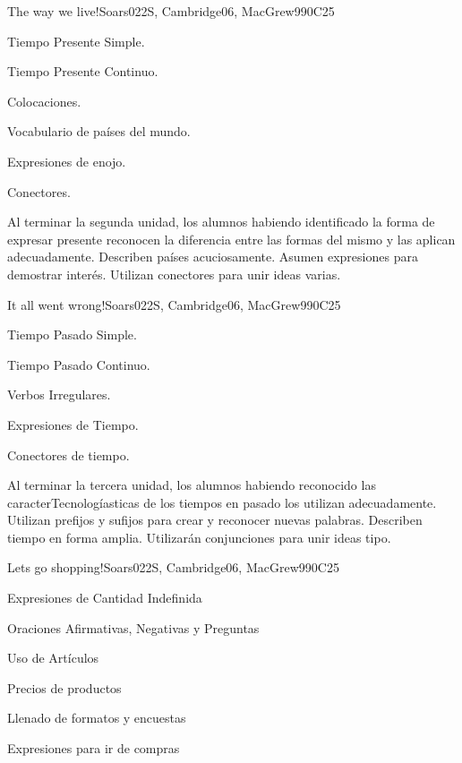 \begin{syllabus}
\begin{unit}{The way we live!}{}{Soars022S, Cambridge06, MacGrew99}{0}{C25}
   \begin{topics}
      \item Tiempo Presente Simple.
      \item Tiempo Presente Continuo.
      \item Colocaciones.
      \item Vocabulario de paí­ses del  mundo.
      \item Expresiones de enojo.
      \item Conectores.
   \end{topics}

   \begin{learningoutcomes}
      \item Al terminar la segunda unidad, los alumnos habiendo identificado la forma de expresar presente reconocen la diferencia entre las formas del mismo y las aplican adecuadamente. Describen paí­ses acuciosamente.  Asumen expresiones para demostrar interés. Utilizan conectores para unir ideas varias.  
   \end{learningoutcomes}
\end{unit}

\begin{unit}{It all went wrong!}{}{Soars022S, Cambridge06, MacGrew99}{0}{C25}
   \begin{topics}
      \item Tiempo Pasado Simple.
      \item Tiempo Pasado Continuo.
      \item Verbos Irregulares.
      \item Expresiones de Tiempo.
      \item Conectores de tiempo.
   \end{topics}

   \begin{learningoutcomes}
      \item Al terminar la tercera unidad, los alumnos habiendo reconocido las caracterTecnologíasticas de los tiempos en pasado los utilizan adecuadamente. Utilizan prefijos y sufijos para crear y reconocer nuevas palabras. Describen tiempo en forma amplia. Utilizarán conjunciones para unir ideas tipo. 
   \end{learningoutcomes}
\end{unit}

\begin{unit}{Lets go shopping!}{}{Soars022S, Cambridge06, MacGrew99}{0}{C25}
   \begin{topics}
      \item Expresiones de Cantidad Indefinida
      \item Oraciones Afirmativas, Negativas y Preguntas
      \item Uso de Artí­culos
      \item Precios de productos
      \item Llenado de formatos y encuestas
      \item Expresiones para ir de compras
   \end{topics}


\end{unit}
\end{syllabus}
